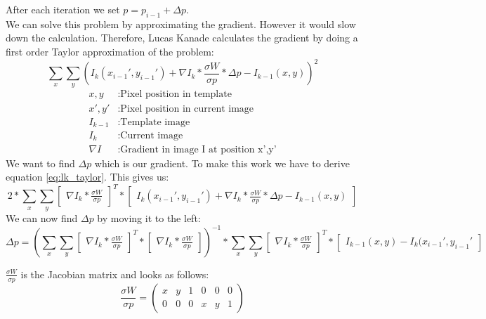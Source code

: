 \documentclass[11pt,a4paper,titlepage,oneside]{report}
\begin{document}
After each iteration we set $p=p_{i-1}+\Delta p$.\\
We can solve this problem by approximating the gradient. However it would slow down the calculation. Therefore, Lucas Kanade calculates the gradient by doing a first order Taylor approximation of the problem:
\begin{equation}\label{eq:lk_taylor}
	\sum_x\sum_y(I_{k}(x_{i-1}',y_{i-1}')+\nabla I_{k}*\frac{\sigma W}{\sigma p}*\Delta p-I_{k-1}(x,y))^2
\end{equation}
\begin{align*}
	x,y				&:	\text{Pixel position in template}\\
	x',y'			&:	\text{Pixel position in current image}\\
	I_{k-1}		&:	\text{Template image}\\
	I_{k}			&:	\text{Current image}\\
	\nabla I	&:	\text{Gradient in image I at position x',y'}
\end{align*}
We want to find $\Delta p$ which is our gradient. To make this work we have to derive equation \ref{eq:lk_taylor}. This gives us:
\begin{equation}
	2*\sum_x\sum_y\begin{bmatrix}\nabla I_{k}*\frac{\sigma W}{\sigma p}\end{bmatrix}^T*\begin{bmatrix}I_{k}(x_{i-1}',y_{i-1}')+\nabla I_{k}*\frac{\sigma W}{\sigma p}*\Delta p-I_{k-1}(x,y)\end{bmatrix}
\end{equation}
We can now find $\Delta p$ by moving it to the left:
\begin{equation}\label{eq:lk_dp}
	\Delta p=(\sum_x\sum_y\begin{bmatrix}\nabla I_{k}*\frac{\sigma W}{\sigma p}\end{bmatrix}^T*\begin{bmatrix}\nabla I_{k}*\frac{\sigma W}{\sigma p}\end{bmatrix})^{-1}
	*\sum_x\sum_y\begin{bmatrix}\nabla I_{k}*\frac{\sigma W}{\sigma p}\end{bmatrix}^T*\begin{bmatrix}I_{k-1}(x,y) - I_{k}(x_{i-1}',y_{i-1}'\end{bmatrix}
\end{equation}

$\frac{\sigma W}{\sigma p}$ is the Jacobian matrix and looks as follows:
\begin{equation}
	\frac{\sigma W}{\sigma p}=
	\begin{pmatrix}
		x & y & 1 & 0 & 0 & 0 \\
		0 & 0 & 0 & x & y & 1
	\end{pmatrix}
\end{equation}
\end{document}
